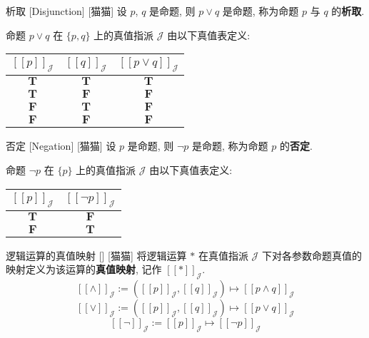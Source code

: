\documentclass[UTF8]{ctexart}
\newcommand{\LT}{\ensuremath{\mathbf{T}}}
\newcommand{\LF}{\ensuremath{\mathbf{F}}}
\newcommand{\assign}[2]{\ensuremath{{[\![#1]\!]}_{#2}}}
\begin{document}
            \begin{dfn}
                [Disjunction]
                {析取}
                [Disjunction]
                [猫猫]
                设 \(p\), \(q\) 是命题, 则 \(p \lor q\) 是命题, 称为命题 \(p\) 与 \(q\) 的\textbf{析取}. 

                命题 \(p\lor q\) 在 \(\{p,q\}\) 上的真值指派 \(\mathcal{J}\) 由以下真值表定义:
                \begin{center}
                \begin{tabular}{|c|c|c|}
                    \hline
                    \(\assign{p}{\mathcal{J}}\) & \(\assign{q}{\mathcal{J}}\) & \(\assign{p\lor q}{\mathcal{J}}\) \\
                    \hline
                    \LT & \LT & \LT \\
                    \LT & \LF & \LF \\
                    \LF & \LT & \LF \\
                    \LF & \LF & \LF \\
                    \hline
                \end{tabular}
                \end{center}
            \end{dfn}

            \begin{dfn}
                [Negation]
                {否定}
                [Negation]
                [猫猫]
                设 \(p\) 是命题, 则 \(\neg p\) 是命题, 称为命题 \(p\) 的\textbf{否定}.

                命题 \(\neg p\) 在 \(\{p\}\) 上的真值指派 \(\mathcal{J}\) 由以下真值表定义:
                \begin{center}
                \begin{tabular}{|c|c|}
                    \hline
                    \(\assign{p}{\mathcal{J}}\) & \(\assign{\neg p}{\mathcal{J}}\) \\
                    \hline
                    \LT & \LF \\
                    \LF & \LT \\
                    \hline
                \end{tabular}
                \end{center}
            \end{dfn}

            \begin{dfn}
                []
                {逻辑运算的真值映射}
                []
                [猫猫]
                将逻辑运算 \(*\) 在真值指派 \(\mathcal{J}\) 下对各参数命题真值的映射定义为该运算的\textbf{真值映射}, 记作 \(\assign{*}{\mathcal{J}}\). 
                \[\assign{\land}{\mathcal{J}}:=(\assign{p}{\mathcal{J}}, \assign{q}{\mathcal{J}})\mapsto\assign{p\land q}{\mathcal{J}}\]
                \[\assign{\lor}{\mathcal{J}}:=(\assign{p}{\mathcal{J}}, \assign{q}{\mathcal{J}})\mapsto\assign{p\lor q}{\mathcal{J}}\]
                \[\assign{\neg}{\mathcal{J}}:=\assign{p}{\mathcal{J}}\mapsto\assign{\neg p}{\mathcal{J}}\]
            \end{dfn}
\end{document}
